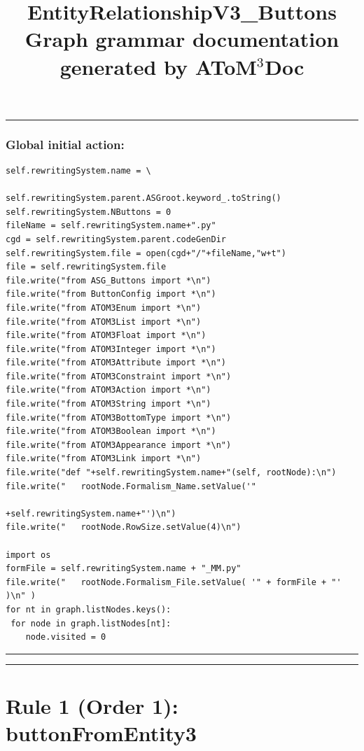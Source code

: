 \documentclass{article}
\title{ \huge{EntityRelationshipV3_Buttons} \\[4mm]
\small{ Graph grammar documentation generated by \textbf{AToM$^{3}$Doc} } }
\begin{document}
   
\maketitle         
\hrule \vspace{6pt}
\subsubsection*{Global initial action: }
\begin{small}\begin{verbatim}
self.rewritingSystem.name = \
                        self.rewritingSystem.parent.ASGroot.keyword_.toString()
self.rewritingSystem.NButtons = 0
fileName = self.rewritingSystem.name+".py"
cgd = self.rewritingSystem.parent.codeGenDir
self.rewritingSystem.file = open(cgd+"/"+fileName,"w+t")
file = self.rewritingSystem.file
file.write("from ASG_Buttons import *\n")
file.write("from ButtonConfig import *\n")
file.write("from ATOM3Enum import *\n")
file.write("from ATOM3List import *\n")
file.write("from ATOM3Float import *\n")
file.write("from ATOM3Integer import *\n")
file.write("from ATOM3Attribute import *\n")
file.write("from ATOM3Constraint import *\n")
file.write("from ATOM3Action import *\n")
file.write("from ATOM3String import *\n")
file.write("from ATOM3BottomType import *\n")
file.write("from ATOM3Boolean import *\n")
file.write("from ATOM3Appearance import *\n")
file.write("from ATOM3Link import *\n")
file.write("def "+self.rewritingSystem.name+"(self, rootNode):\n")
file.write("   rootNode.Formalism_Name.setValue('"
                                            +self.rewritingSystem.name+"')\n")
file.write("   rootNode.RowSize.setValue(4)\n")

import os
formFile = self.rewritingSystem.name + "_MM.py" 
file.write("   rootNode.Formalism_File.setValue( '" + formFile + "' )\n" )
for nt in graph.listNodes.keys():
 for node in graph.listNodes[nt]:
    node.visited = 0
\end{verbatim}\end{small}

\hrule \vspace{6pt}
\hrule \vspace{6pt}
\section*{  Rule 1 (Order 1): buttonFromEntity3}
\end{document}

